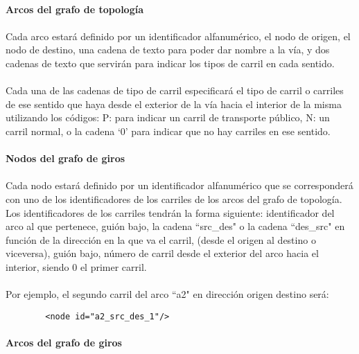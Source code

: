 	\paragraph{Arcos del grafo de topología}	
	\paragraph{}
	Cada arco estará definido por un identificador alfanumérico, el nodo de origen, el nodo de destino, una cadena de texto para poder dar nombre a la vía, y dos cadenas de texto que servirán para indicar los tipos de carril en cada sentido.
	
	\paragraph{}
	Cada una de las cadenas de tipo de carril especificará el tipo de carril o carriles de ese sentido que haya desde el exterior de la vía hacia el interior de la misma utilizando los códigos: P: para indicar un carril de transporte público, N: un carril normal, o la cadena `0' para indicar que no hay carriles en ese sentido.
	
	\paragraph{Nodos del grafo de giros}
	
	\paragraph{}
	Cada nodo estará definido por un identificador alfanumérico que se corresponderá con uno de los identificadores de los carriles de los arcos del grafo de topología. Los identificadores de los carriles tendrán la forma siguiente: identificador del arco al que pertenece, guión bajo, la cadena ``src\_des" o la cadena ``des\_src" en función de la dirección en la que va el carril, (desde el origen al destino o viceversa), guión bajo, número de carril desde el exterior del arco hacia el interior, siendo 0 el primer carril.
	\paragraph{}
	Por ejemplo, el segundo carril del arco ``a2" en dirección origen destino será:
	\begin{lstlisting}
		<node id="a2_src_des_1"/>
	\end{lstlisting}
	
	\paragraph{Arcos del grafo de giros}
	
